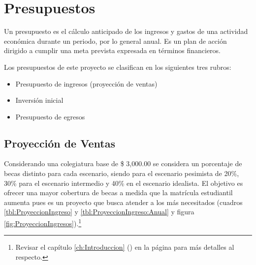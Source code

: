 





\clearpage
\section{Presupuestos}

Un presupuesto es el cálculo anticipado de los ingresos y gastos de una actividad económica durante un periodo, por lo general anual. Es un plan de acción dirigido a cumplir una meta prevista expresada en términos financieros.

Los presupuestos de este proyecto se clasifican en los siguientes tres rubros:

\begin{itemize}
	\item Presupuesto de ingresos (proyección de ventas)
	\item Inversión inicial
	\item Presupuesto de egresos
\end{itemize}

\subsection{Proyección de Ventas}

Considerando una colegiatura base de \$ 3,000.00 se considera un porcentaje de becas distinto para cada escenario, siendo para el escenario pesimista de 20\%, 30\% para el escenario intermedio y 40\% en el escenario idealista. El objetivo es ofrecer una mayor cobertura de becas a medida que la matrícula estudiantil aumenta pues es un proyecto que busca atender a los más necesitados (cuadros \ref{tbl:ProyeccionIngreso} y \ref{tbl:ProyeccionIngreso:Anual} y figura \ref{fig:ProyeccionIngresos}).\footnote{Revisar el capítulo \ref{ch:Introduccion} () en la página \pageref{ch:Introduccion} para más detalles al respecto.}





